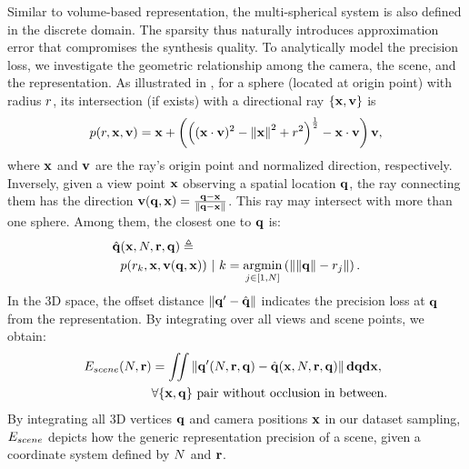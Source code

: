 Similar to volume-based representation, the multi-spherical system is also defined in the discrete domain. The sparsity thus naturally introduces approximation error that compromises the synthesis quality. To analytically model the precision loss, we investigate the geometric relationship among the camera, the scene, and the representation.
As illustrated in ,  for a sphere (located at origin point) with radius $r$, its intersection (if exists) with a directional ray $\{\mathbf{x},\mathbf{v}\}$ is
\begin{equation}
p(r,\mathbf{x},\mathbf{v}) = \mathbf{x} + \left({\left((\mathbf{x}\cdot\mathbf{v})^2-\left\lVert\mathbf{x}\right\rVert^2+r^2\right)}^{\frac{1}{2}}-\mathbf{x}\cdot\mathbf{v}\right)\mathbf{v},
\label{eq:raySphereIntersection}
\end{equation}
where $\mathbf{x}$ and $\mathbf{v}$ are the ray's origin point and normalized direction, respectively.
Inversely, given a view point $\mathbf{x}$ observing a spatial location $\mathbf{q}$, the ray connecting them has the direction $\mathbf{v}(\mathbf{q},\mathbf{x})=\frac{\mathbf{q}-\mathbf{x}}{\left\lVert\mathbf{q}-\mathbf{x}\right\rVert}$. This ray may intersect with more than one sphere. Among them, the closest one to $\mathbf{q}$ is:
\begin{equation}\label{eq:closestPointImg}
\begin{aligned}
    \hat{\pt}&(\rayo,\sphereNum, \mathbf{\sphereRadius},\SpatialPt) \triangleq \\
    &\intersectionFunc(\sphereRadius_k,\rayo,\rayd(\SpatialPt,\rayo))\ |\ k=\argmin_{j\in[1,\sphereNum]}\left(\norm{\norm{\SpatialPt}-\sphereRadius_j}\right).
\end{aligned}
\end{equation}
In the 3D space, the offset distance $\left\lVert\mathbf{q}^\prime-\hat{\mathbf{q}}\right\rVert$ indicates the precision loss at $\mathbf{q}$ from the representation. By integrating over all views and scene points, we obtain:
\begin{equation}
\begin{aligned}
E_{scene}(N, \mathbf{r})  &= \iint \left\lVert\mathbf{q}^\prime(N,\mathbf{r},\mathbf{q})-\hat{\mathbf{q}}(\mathbf{x},N, \mathbf{r},\mathbf{q})\right\rVert \mathbf{d}\mathbf{q} \mathbf{d}\mathbf{x},\\
&\forall \{\mathbf{x}, \mathbf{q}\} \text{ pair without occlusion in between}.
\label{eq:sparseError}
\end{aligned}
\end{equation}
By integrating all 3D vertices $\mathbf{q}$ and camera positions $\mathbf{x}$ in our dataset sampling, $E_{scene}$ depicts how the generic representation precision of a scene, given a coordinate system defined by $N$ and $\mathbf{r}$.

